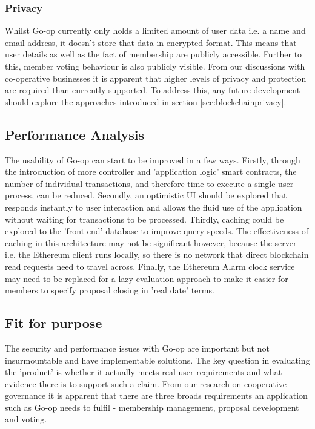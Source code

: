 \subsubsection{Privacy}
Whilst Go-op currently only holds a limited amount of user data i.e. a name and email address, it doesn't store that data in encrypted format. This means that user details as well as the fact of membership are publicly accessible. Further to this, member voting behaviour is also publicly visible. From our discussions with co-operative businesses it is apparent that higher levels of privacy and protection are required than currently supported. To address this, any future development should explore the approaches introduced in section \ref{sec:blockchainprivacy}.

\subsection{Performance Analysis}
The usability of Go-op can start to be improved in a few ways. Firstly, through the introduction of more controller and 'application logic' smart contracts, the number of individual transactions, and therefore time to execute a single user process, can be reduced. Secondly, an optimistic UI should be explored that responds instantly to user interaction and allows the fluid use of the application without waiting for transactions to be processed. Thirdly, caching could be explored to the 'front end' database to improve query speeds. The effectiveness of caching in this architecture may not be significant however, because the server i.e. the Ethereum client runs locally, so there is no network that direct blockchain read requests need to travel across. Finally, the Ethereum Alarm clock service may need to be replaced for a lazy evaluation approach to make it easier for members to specify proposal closing in 'real date' terms.\\

\subsection{Fit for purpose}
The security and performance issues with Go-op are important but not insurmountable and have implementable solutions. The key question in evaluating the 'product' is whether it actually meets real user requirements and what evidence there is to support such a claim. From our research on cooperative governance it is apparent that there are three broads requirements an application such as Go-op needs to fulfil - membership management, proposal development and voting. \\

